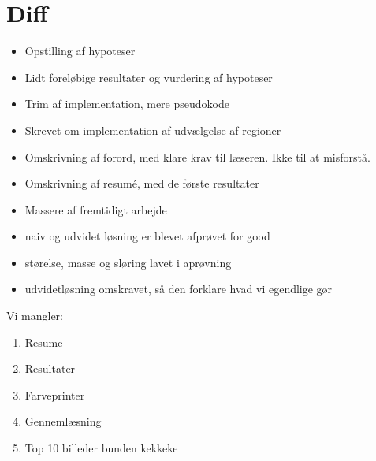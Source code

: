 {
\section*{Diff}
\begin{itemize}
    \item Opstilling af hypoteser
    \item Lidt foreløbige resultater og vurdering af hypoteser
    \item Trim af implementation, mere pseudokode
    \item Skrevet om implementation af udvælgelse af regioner
    \item Omskrivning af forord, med klare krav til læseren. Ikke
        til at misforstå.
    \item Omskrivning af resumé, med de første resultater
    \item Massere af fremtidigt arbejde
	\item naiv og udvidet løsning er blevet afprøvet for good
	\item størelse, masse og sløring lavet i aprøvning
	\item udvidetløsning omskravet, så den forklare hvad vi egendlige gør
\end{itemize}

Vi mangler:
\begin{enumerate}
	\item Resume
	\item Resultater
	\item Farveprinter
	\item Gennemlæsning
	\item Top 10 billeder bunden kekkeke
\end{enumerate}
}

